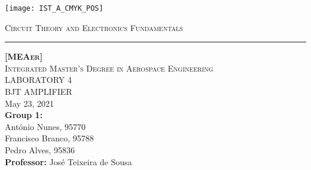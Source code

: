 \thispagestyle {empty}

\begin{titlepage}

\texttt{[image: IST\_A\_CMYK\_POS]} \\[1cm]

\centering

\textsc{\large{Circuit Theory and Electronics Fundamentals}} \\[0.25cm]
\hrule
\vspace{1.75cm}

\textsc{\textbf {[MEAer]}} \\[0.5cm]
\textsc{Integrated Master's Degree in Aerospace Engineering} \\[3.25cm]
\MakeUppercase{\Huge Laboratory 4} \\[0.75cm]
\MakeUppercase{\huge BJT Amplifier} \\[3.5cm]
May 23, 2021 \\[2.5cm]
\textbf{Group 1:} \\[0.5cm]
António Nunes, 95770 \\
Francisco Branco, 95788 \\
Pedro Alves, 95836 \\[2cm]
\textbf{Professor:} José Teixeira de Sousa 
\end{titlepage}


